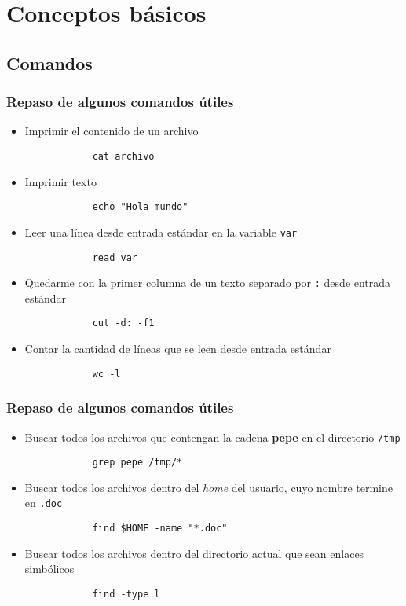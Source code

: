 \section{Conceptos básicos}
\subsection{Comandos}
\begin{frame}[fragile]
	\frametitle{Repaso de algunos comandos útiles}
	\begin{itemize}
		\item Imprimir el contenido de un archivo
		\begin{lstlisting}
			cat archivo
		\end{lstlisting}
		\item Imprimir texto
		\begin{lstlisting}
			echo "Hola mundo"
		\end{lstlisting}
		\item Leer una línea desde entrada estándar en la variable \texttt{var}
		\begin{lstlisting}
			read var
		\end{lstlisting}
      \item Quedarme con la primer columna de un texto separado por
        \texttt{:} desde entrada estándar
		\begin{lstlisting}
			cut -d: -f1
		\end{lstlisting}
		\item Contar la cantidad de líneas que se leen desde entrada estándar
		\begin{lstlisting}
			wc -l
		\end{lstlisting}
	\end{itemize}
\end{frame}

\begin{frame}[fragile]
	\frametitle{Repaso de algunos comandos útiles}
	\begin{itemize}
    \item Buscar todos los archivos que contengan la cadena \textbf{pepe}
      en el directorio \texttt{/tmp}
		\begin{lstlisting}
			grep pepe /tmp/*
		\end{lstlisting}
      \item Buscar todos los archivos dentro del \textit{home} del usuario,
        cuyo nombre termine en \texttt{.doc}
		\begin{lstlisting}
			find $HOME -name "*.doc"
		\end{lstlisting}%
		
		\item Buscar todos los archivos dentro del directorio actual que sean enlaces simbólicos
		\begin{lstlisting}
			find -type l
		\end{lstlisting}
	\end{itemize}
\end{frame}

